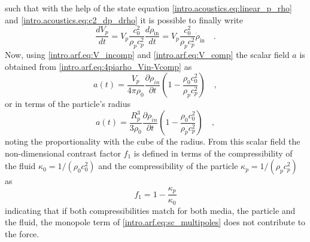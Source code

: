 such that with the help of the state equation \eqref{intro.acoustics.eq:linear_p_rho} and \eqref{intro.acoustics.eq:c2_dp_drho} it is possible to finally write
\begin{equation}\label{intro.arf.eq:V_comp}
    \frac{dV_p}{dt} = V_p\frac{c_0^2}{\rho_p c_p^2} \frac{d\rho_{\text{in}}}{dt} = V_p\frac{c_0^2}{\rho_p c_p^2}\dot{\rho}_{\text{in}}\quad.
\end{equation}
Now, using \eqref{intro.arf.eq:V_incomp} and \eqref{intro.arf.eq:V_comp} the scalar field $a$ is obtained from \eqref{intro.arf.eq:4piarho_Vin-Vcomp} as
\begin{equation}\label{intro.arf.eq:a_field_Vp}
    a(t) = \frac{V_p}{4\pi\rho_0}\frac{\partial\rho_{in}}{\partial t}\left(1-\frac{\rho_0c_0^2}{\rho_pc_p^2}\right)\quad,
\end{equation}
or in terms of the particle's radius  
\begin{equation}\label{intro.arf.eq:a_field_Rp}
    a(t) = \frac{R_p^3}{3\rho_0}\frac{\partial\rho_{in}}{\partial t}\left(1-\frac{\rho_0c_0^2}{\rho_pc_p^2}\right)\quad,
\end{equation}
noting the proportionality with the cube of the radius. From this scalar field the non-dimensional contrast factor $f_1$ is defined in terms of the compressibility of the fluid $\kappa_0 = 1/(\rho_0c_0^2)$ and the compressibility of the particle $\kappa_p = 1/(\rho_pc_p^2)$ as
\begin{equation}
    f_1 = 1-\frac{\kappa_p}{\kappa_0}
\end{equation}
indicating that if both compressibilities match for both media, the particle and the fluid, the monopole term of \eqref{intro.arf.eq:sc_multipoles} does not contribute to the force. 


